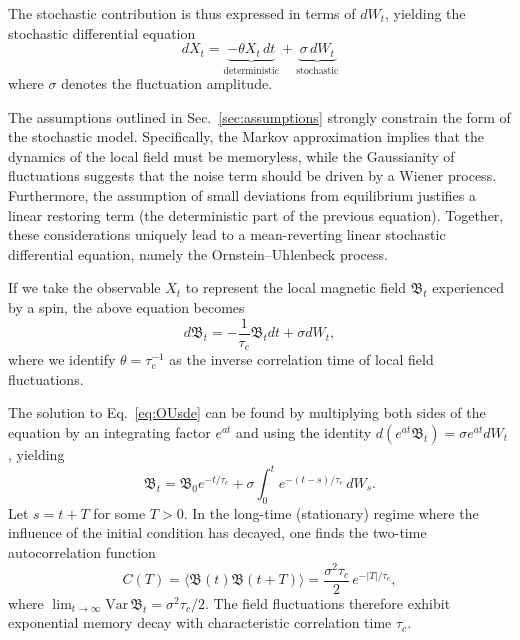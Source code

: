 \documentclass[%
 reprint,
 amsmath,amssymb,
 aps,
]{revtex4-2}
\begin{document}
The stochastic contribution is thus expressed in terms of $dW_t$, yielding the stochastic differential equation
\begin{equation*}
    dX_t =
    \underbrace{-\theta X_t\, dt}_{\text{deterministic}}
    +
    \underbrace{\sigma\, dW_t}_{\text{stochastic}}
\end{equation*}
where $\sigma$ denotes the fluctuation amplitude. 

The assumptions outlined in Sec.~\ref{sec:assumptions} strongly constrain the form of the stochastic model. Specifically, the Markov approximation implies that the dynamics of the local field must be memoryless, while the Gaussianity of fluctuations suggests that the noise term should be driven by a Wiener process. Furthermore, the assumption of small deviations from equilibrium justifies a linear restoring term (the deterministic part of the previous equation). Together, these considerations uniquely lead to a mean-reverting linear stochastic differential equation, namely the Ornstein--Uhlenbeck process.

If we take the observable $X_t$ to represent the local magnetic field $\mathfrak{B}_t$ experienced by a spin, the above equation becomes
\begin{equation}
    d\mathfrak{B}_t = -\frac{1}{\tau_c} \mathfrak{B}_t dt + \sigma dW_t,
    \label{eq:OUsde}
\end{equation}
where we identify $\theta = \tau_c^{-1}$ as the inverse correlation time of local field fluctuations.

The solution to Eq.~\ref{eq:OUsde} can be found by multiplying both sides of the equation by an integrating factor $e^{at}$ and using the identity $d\left(e^{at}\mathfrak{B}_t\right)=\sigma e^{at}dW_t$, yielding
\begin{equation}
    \mathfrak{B}_t = \mathfrak{B}_0 e^{-t/\tau_c}
    + \sigma \int_0^t e^{-(t-s)/\tau_c}\, dW_s.
    \label{eq:OU_soln}
\end{equation}
Let $s = t + T$ for some $T>0$. In the long-time (stationary) regime where the influence of the initial condition has decayed, one finds the two-time autocorrelation function
\begin{equation}
    C(T) = \langle \mathfrak{B}(t)\mathfrak{B}(t+T)\rangle = \frac{\sigma^2\tau_c}{2}\,e^{-|T|/\tau_c},
    \label{eq:autocorr}
\end{equation}
where $\lim_{t\rightarrow\infty}\mathrm{Var}\,\mathfrak{B}_t=\sigma^2\tau_c/2$. The field fluctuations therefore exhibit exponential memory decay with characteristic correlation time $\tau_c$.
\end{document}
